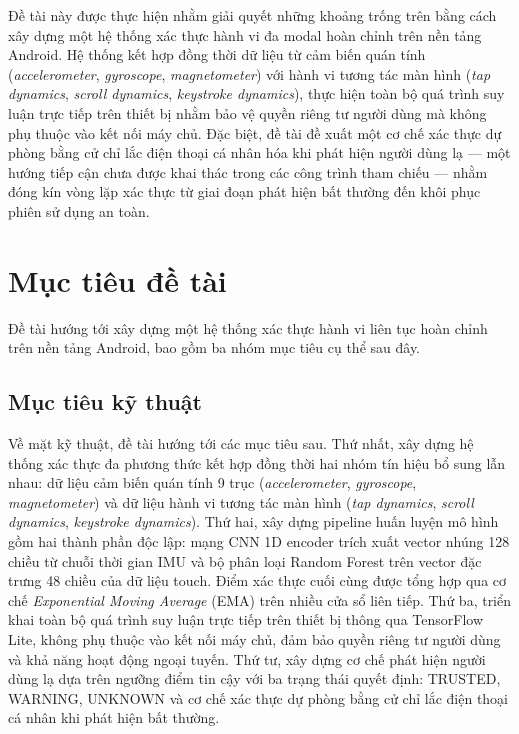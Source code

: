 \documentclass[../DoAn.tex]{subfiles}
\begin{document}
    Đề tài này được thực hiện nhằm giải quyết những khoảng trống trên bằng cách xây dựng một hệ thống xác thực hành vi đa modal hoàn chỉnh trên nền tảng Android. Hệ thống kết hợp đồng thời dữ liệu từ cảm biến quán tính (\textit{accelerometer}, \textit{gyroscope}, \textit{magnetometer}) với hành vi tương tác màn hình (\textit{tap dynamics}, \textit{scroll dynamics}, \textit{keystroke dynamics}), thực hiện toàn bộ quá trình suy luận trực tiếp trên thiết bị nhằm bảo vệ quyền riêng tư người dùng mà không phụ thuộc vào kết nối máy chủ. Đặc biệt, đề tài đề xuất một cơ chế xác thực dự phòng bằng cử chỉ lắc điện thoại cá nhân hóa khi phát hiện người dùng lạ --- một hướng tiếp cận chưa được khai thác trong các công trình tham chiếu --- nhằm đóng kín vòng lặp xác thực từ giai đoạn phát hiện bất thường đến khôi phục phiên sử dụng an toàn.

    \section{Mục tiêu đề tài}
    \label{sec:muctieu}

    Đề tài hướng tới xây dựng một hệ thống xác thực hành vi liên tục hoàn chỉnh trên nền tảng Android, bao gồm ba nhóm mục tiêu cụ thể sau đây.

    \subsection{Mục tiêu kỹ thuật}

    Về mặt kỹ thuật, đề tài hướng tới các mục tiêu sau. Thứ nhất, xây dựng hệ thống xác thực đa phương thức kết hợp đồng thời hai nhóm tín hiệu bổ sung lẫn nhau: dữ liệu cảm biến quán tính 9 trục (\textit{accelerometer}, \textit{gyroscope}, \textit{magnetometer}) và dữ liệu hành vi tương tác màn hình (\textit{tap dynamics}, \textit{scroll dynamics}, \textit{keystroke dynamics}). Thứ hai, xây dựng pipeline huấn luyện mô hình gồm hai thành phần độc lập: mạng CNN 1D encoder trích xuất vector nhúng 128 chiều từ chuỗi thời gian IMU và bộ phân loại Random Forest trên vector đặc trưng 48 chiều của dữ liệu touch. Điểm xác thực cuối cùng được tổng hợp qua cơ chế \textit{Exponential Moving Average} (EMA) trên nhiều cửa sổ liên tiếp. Thứ ba, triển khai toàn bộ quá trình suy luận trực tiếp trên thiết bị thông qua TensorFlow Lite, không phụ thuộc vào kết nối máy chủ, đảm bảo quyền riêng tư người dùng và khả năng hoạt động ngoại tuyến. Thứ tư, xây dựng cơ chế phát hiện người dùng lạ dựa trên ngưỡng điểm tin cậy với ba trạng thái quyết định: TRUSTED, WARNING, UNKNOWN và cơ chế xác thực dự phòng bằng cử chỉ lắc điện thoại cá nhân khi phát hiện bất thường.
\end{document}
